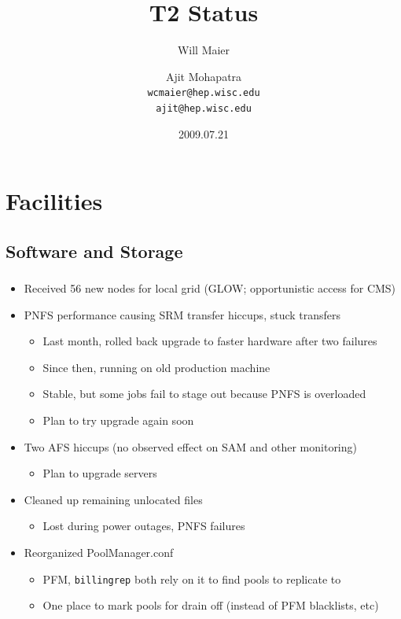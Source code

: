 \documentclass{beamer}
\title{T2 Status}
\author[Maier, Mohapatra]{
    Will Maier \and Ajit Mohapatra\\ 
    {\tt wcmaier@hep.wisc.edu}\\
    {\tt ajit@hep.wisc.edu}}
\institute[Wisconsin]{University of Wisconsin - High Energy Physics}
\date{2009.07.21}
\begin{document}
\begin{frame}
    \titlepage
\end{frame}


\section{Facilities}
\subsection{Software and Storage}
\begin{frame}
\frametitle{}

\begin{itemize}
	\item Received 56 new nodes for local grid (GLOW; opportunistic access for CMS)
	\item PNFS performance causing SRM transfer hiccups, stuck transfers
	\begin{itemize}
		\item Last month, rolled back upgrade to faster hardware after two failures
		\item Since then, running on old production machine
		\item Stable, but some jobs fail to stage out because PNFS is overloaded
		\item Plan to try upgrade again soon
	\end{itemize}
	\item Two AFS hiccups (no observed effect on SAM and other monitoring)
	\begin{itemize}
		\item Plan to upgrade servers
	\end{itemize}
	\item Cleaned up remaining unlocated files
	\begin{itemize}
		\item Lost during power outages, PNFS failures
	\end{itemize}
	\item Reorganized PoolManager.conf
	\begin{itemize}
		\item PFM, {\tt billingrep} both rely on it to find pools to replicate to
		\item One place to mark pools for drain off (instead of PFM blacklists, etc)
	\end{itemize}
\end{itemize}

\end{frame}
\end{document}
